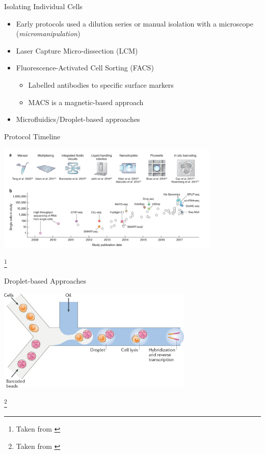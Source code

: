 \documentclass[aspectratio=169,11pt]{beamer}
\newcommand\blfootnote[1]{%
  \begingroup
  \renewcommand\thefootnote{}\footnote{#1}%
  \addtocounter{footnote}{-1}%
  \endgroup
}
\begin{document}
\begin{frame}{Isolating Individual Cells}

	\begin{itemize}
		\item Early protocols used a dilution series or manual isolation with a microscope (\textit{micromanipulation})
		\item Laser Capture Micro-dissection (LCM)
		\item Fluorescence-Activated Cell Sorting (FACS)
		\begin{itemize}
			\item Labelled antibodies to specific surface markers 
			\item MACS is a magnetic-based approach
		\end{itemize}
		\item Microfluidics/Droplet-based approaches
	\end{itemize}

\end{frame}

\begin{frame}{Protocol Timeline}

	\begin{center}
		\includegraphics[width=0.8\textwidth]{figures/scRNATimeline.jpg} 
	\end{center}

	\blfootnote{Taken from \cite{pmid29494575}}

\end{frame}

\begin{frame}{Droplet-based Approaches}

	\begin{center}
		\includegraphics[width=0.7\textwidth]{figures/Droplet.jpg}
	\end{center}
	
	\blfootnote{Taken from \cite{pmid29789704}}

\end{frame}
\end{document}
